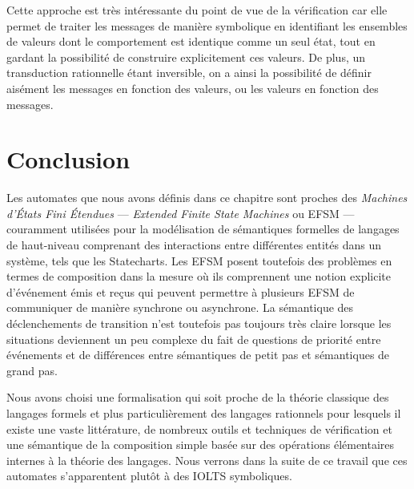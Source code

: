 Cette approche est tr\`es int\'eressante du point de vue de la
v\'erification car elle permet de traiter les messages de mani\`ere
symbolique en identifiant les ensembles de valeurs dont le
comportement est identique comme un seul \'etat, tout en gardant la
possibilit\'e de construire explicitement ces valeurs. De plus, un
transduction rationnelle \'etant inversible, on a ainsi la
possibilit\'e de d\'efinir ais\'ement les messages en fonction des
valeurs, ou les valeurs en fonction des messages.

\section{Conclusion}

Les automates que nous avons d\'efinis dans ce chapitre sont proches
des \emph{Machines d'\'Etats Fini \'Etendues} --- \emph{Extended Finite
State Machines} ou \textsf{EFSM} --- couramment utilis\'ees pour
la mod\'elisation de s\'emantiques formelles de langages de
haut-niveau comprenant des interactions entre diff\'erentes
entit\'es dans un syst\`eme, tels que les Statecharts. Les EFSM
posent toutefois des probl\`emes en termes de composition dans la
mesure o\`u ils comprennent une notion explicite d'\'ev\'enement
\'emis et re\c{c}us qui peuvent permettre \`a plusieurs EFSM de
communiquer de mani\`ere synchrone ou asynchrone. La s\'emantique
des d\'eclenchements de transition n'est toutefois pas toujours
tr\`es claire lorsque les situations deviennent un peu complexe du
fait de questions de priorit\'e entre \'ev\'enements et de
diff\'erences entre s\'emantiques de petit pas et s\'emantiques de
grand pas.

Nous avons choisi une formalisation qui soit proche de la th\'eorie
classique des langages formels et plus particuli\`erement des
langages rationnels pour lesquels il existe une vaste litt\'erature,
de nombreux outils et  techniques de v\'erification et une
s\'emantique de la composition simple bas\'ee sur des op\'erations
\'el\'ementaires internes \`a la th\'eorie des langages. Nous
verrons dans la suite de ce travail que ces automates s'apparentent
plut\^ot \`a des \textsf{IOLTS} symboliques.

 